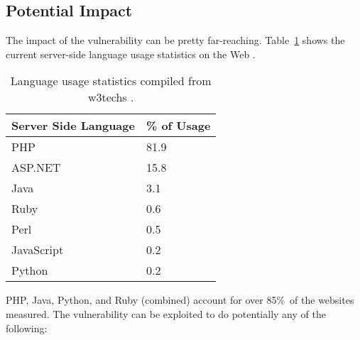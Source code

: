 \subsection{Potential Impact}

The impact of the vulnerability can be pretty far-reaching.
Table~\ref{tab:usage} shows the current server-side language usage statistics on the Web \cite{W3techs}. 

\begin{table}[!tb]
	\centering
	\begin{tabular}{|p{4cm}|p{4cm}|}
		\hline
		\multicolumn{1}{|c|}{\textbf{Server Side Language}} & \multicolumn{1}{c|}{\textbf{\% of Usage}}\\
		\hline
		PHP & 81.9\\
		\hline    
		ASP.NET & 15.8\\
		\hline
		Java & 3.1\\
		\hline
		Ruby & 0.6\\
		\hline
		Perl & 0.5\\
		\hline
		JavaScript & 0.2\\
		\hline
		Python & 0.2\\
		\hline
		
	\end{tabular}
	\caption[]{Language usage statistics compiled from w3techs \cite{W3techs}.}
	\label{tab:usage}
\end{table}

PHP, Java, Python, and Ruby (combined) account for over 85\%\,\footnotemark{} of the websites measured. The vulnerability can be exploited to do potentially any of the following:



